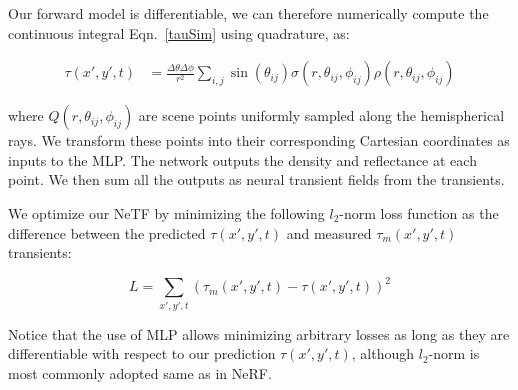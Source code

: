 \documentclass[10pt,journal,compsoc]{IEEEtran}
\begin{document}
Our forward model is differentiable, we can therefore numerically compute the continuous integral Eqn.~\ref{tauSim} using quadrature, as:

\begin{equation}
\begin{aligned}
\tau(x',y',t) &= \frac{\Delta \theta \Delta \phi}{r^2} \sum_{i,j} \sin{(\theta_{ij})} \sigma(r,\theta_{ij},\phi_{ij}) \rho( r, \theta_{ij},\phi_{ij}) 
\end{aligned}
\end{equation}

 
\noindent where $Q(r,\theta_{ij},\phi_{ij})$ are scene points uniformly sampled along the hemispherical rays. We transform these points into their corresponding Cartesian coordinates as inputs to the MLP. The network outputs the density and reflectance at each point. We then sum all the outputs as neural transient fields from the transients. 

We optimize our NeTF by minimizing the following $l_2$-norm loss function as the difference between the predicted $\tau(x',y',t)$ and measured $\tau_m(x',y',t)$ transients:

\begin{equation}
L =\sum_{x',y',t} (\tau_m(x',y',t) - \tau(x',y',t))^2
\end{equation}

Notice that the use of MLP allows minimizing arbitrary losses as long as they are differentiable with respect to our prediction $\tau(x',y',t)$, although $l_2$-norm is most commonly adopted same as in NeRF. 

\end{document}
